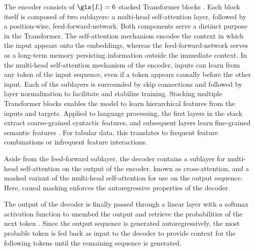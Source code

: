 The encoder consists of $\gls{L}=6$ stacked Transformer blocks \autocite[][6]{vaswaniAttentionAllYou2017}. Each block itself is composed of two sublayers: a multi-head self-attention layer, followed by a position-wise, \gls{feed-forward-network}. Both components serve a distinct purpose in the Transformer. The self-attention mechanism encodes the context in which the input appears onto the \glspl{embedding}, whereas the \gls{feed-forward-network} serves as a long-term memory persisting information outside the immediate context. In the multi-head self-attention mechanism of the encoder, inputs can learn from any \gls{token} of the input sequence, even if a \gls{token} appears causally before the other input. Each of the sublayers is surrounded by skip connections \autocite[][2]{heDeepResidualLearning2015} and followed by layer normalization \autocite[][4]{baLayerNormalization2016} to facilitate and stabilize training. Stacking multiple Transformer blocks enables the model to learn hierarchical features from the inputs and targets. Applied to language processing, the first layers in the stack extract coarse-grained syntactic features, and subsequent layers learn fine-grained semantic features \autocites[][3651]{jawaharWhatDoesBERT2019}[][4596]{tenneyBERTRediscoversClassical2019}. For tabular data, this translates to frequent feature combinations or infrequent feature interactions.

Aside from the feed-forward sublayer, the decoder contains a sublayer for multi-head self-attention on the output of the encoder, known as cross-attention, and a masked variant of the multi-head self-attention for use on the output sequence. Here, causal masking enforces the autoregressive properties of the decoder.

The output of the decoder is finally passed through a linear layer with a softmax activation function to unembed the output and retrieve the probabilities of the next \gls{token} \autocite[][5]{vaswaniAttentionAllYou2017}. Since the output sequence is generated autoregressively, the most probable \gls{token} is fed back as input to the decoder to provide context for the following \glspl{token} until the remaining sequence is generated.

